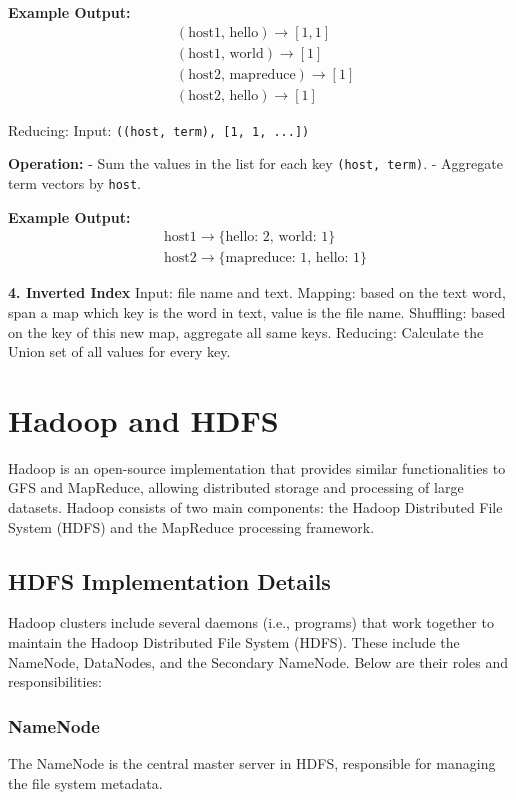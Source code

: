 \documentclass[12pt]{article}
\begin{document}
\textbf{Example Output:}
\[
\begin{aligned}
&(\text{host1, hello}) \to [1, 1] \\
&(\text{host1, world}) \to [1] \\
&(\text{host2, mapreduce}) \to [1] \\
&(\text{host2, hello}) \to [1]
\end{aligned}
\]

Reducing:
Input: \texttt{((host, term), [1, 1, ...])}

\textbf{Operation:}
- Sum the values in the list for each key \texttt{(host, term)}.
- Aggregate term vectors by \texttt{host}.

\textbf{Example Output:}
\[
\begin{aligned}
&\text{host1} \to \{\text{hello: 2, world: 1}\} \\
&\text{host2} \to \{\text{mapreduce: 1, hello: 1}\}
\end{aligned}
\]

\textbf{4. Inverted Index}
Input: file name and text.
Mapping: based on the text word, span a map which key is the word in text, value is the file name.
Shuffling: based on the key of this new map, aggregate all same keys.
Reducing: Calculate the Union set of all values for every key.





\section{Hadoop and HDFS}
Hadoop is an open-source implementation that provides similar functionalities to GFS and MapReduce, allowing distributed storage and processing of large datasets. Hadoop consists of two main components: the Hadoop Distributed File System (HDFS) and the MapReduce processing framework.

\subsection{HDFS Implementation Details}
Hadoop clusters include several daemons (i.e., programs) that work together to maintain the Hadoop Distributed File System (HDFS). These include the NameNode, DataNodes, and the Secondary NameNode. Below are their roles and responsibilities:

\subsubsection{NameNode}
The NameNode is the central master server in HDFS, responsible for managing the file system metadata.
\end{document}
